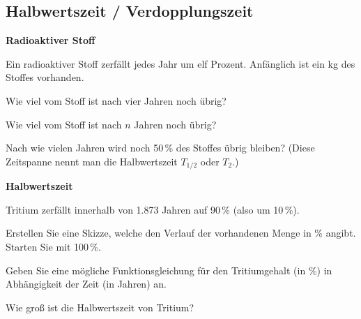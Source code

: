 
\subsection{Halbwertszeit / Verdopplungszeit}


\bbwActAufgabenNr{} \textbf{Radioaktiver Stoff}

Ein radioaktiver Stoff zerfällt jedes Jahr um elf Prozent. Anfänglich ist ein kg des Stoffes vorhanden.

\begin{bbwAufgabenBlock}
\item Wie viel vom Stoff ist nach vier Jahren noch übrig?
\item Wie viel vom Stoff ist nach $n$ Jahren noch übrig?
\item Nach wie vielen Jahren wird noch 50\,\% des Stoffes übrig bleiben?
  (Diese Zeitspanne nennt man die Halbwertszeit $T_{1/2}$ oder $T_2$.)
\end{bbwAufgabenBlock}
\platzFuerBerechnungenBisEndeSeite{}



\bbwActAufgabenNr{} \textbf{Halbwertszeit}

Tritium zerfällt innerhalb von 1.873 Jahren auf 90\,\%  (also um 10\,\%).


\begin{bbwAufgabenBlock}
\item Erstellen Sie eine Skizze, welche den Verlauf der vorhandenen
  Menge in \% angibt. Starten Sie mit 100\,\%.


\item Geben Sie eine mögliche Funktionsgleichung für den Tritiumgehalt
  (in \%)
  in Abhängigkeit der Zeit (in Jahren) an.

  
\item  
  Wie groß ist die Halbwertszeit von Tritium?

\end{bbwAufgabenBlock}
\platzFuerBerechnungenBisEndeSeite{}


